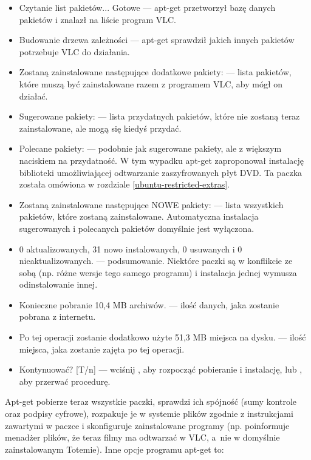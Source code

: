 \begin{itemize}
\item \textcolor{ubuntu_orange}{Czytanie list pakietów... Gotowe} --- apt-get przetworzył bazę danych pakietów i znalazł na liście program VLC.
\item \textcolor{ubuntu_orange}{Budowanie drzewa zależności} --- apt-get sprawdził jakich innych pakietów potrzebuje VLC do działania.
\item \textcolor{ubuntu_orange}{Zostaną zainstalowane następujące dodatkowe pakiety:} --- lista pakietów, które muszą być zainstalowane razem z programem VLC, aby mógł on działać.
\item \textcolor{ubuntu_orange}{Sugerowane pakiety:} --- lista przydatnych pakietów, które nie zostaną teraz zainstalowane, ale mogą się kiedyś przydać.
\item \textcolor{ubuntu_orange}{Polecane pakiety:} --- podobnie jak sugerowane pakiety, ale z większym naciskiem na przydatność. W tym wypadku apt-get zaproponował instalację biblioteki umożliwiającej odtwarzanie zaszyfrowanych płyt DVD. Ta paczka została omówiona w rozdziale \ref{ubuntu-restricted-extras}.
\item \textcolor{ubuntu_orange}{Zostaną zainstalowane następujące NOWE pakiety:} --- lista wszystkich pakietów, które zostaną zainstalowane. Automatyczna instalacja sugerowanych i polecanych pakietów domyślnie jest wyłączona.
\item \textcolor{ubuntu_orange}{0 aktualizowanych, 31 nowo instalowanych, 0 usuwanych i 0 nieaktualizowanych.} --- podsumowanie. Niektóre paczki są w konflikcie ze sobą (np. różne wersje tego samego programu) i instalacja jednej wymusza odinstalowanie innej.
\item \textcolor{ubuntu_orange}{Konieczne pobranie 10,4 MB archiwów.} --- ilość danych, jaka zostanie  pobrana z internetu.
\item \textcolor{ubuntu_orange}{Po tej operacji zostanie dodatkowo użyte 51,3 MB miejsca na dysku.} --- ilość miejsca, jaka zostanie zajęta po tej operacji.
\item \textcolor{ubuntu_orange}{Kontynuować? [T/n]} --- wciśnij , aby rozpocząć pobieranie i instalację, lub , aby przerwać procedurę.
\end{itemize}

Apt-get pobierze teraz wszystkie paczki, sprawdzi ich spójność (sumy kontrole oraz podpisy cyfrowe), rozpakuje je w systemie plików zgodnie z instrukcjami zawartymi w paczce i skonfiguruje zainstalowane programy (np. poinformuje menadżer plików, że teraz filmy ma odtwarzać w VLC, a~nie w domyślnie zainstalowanym Totemie).
\clearpage
Inne opcje programu apt-get to:

